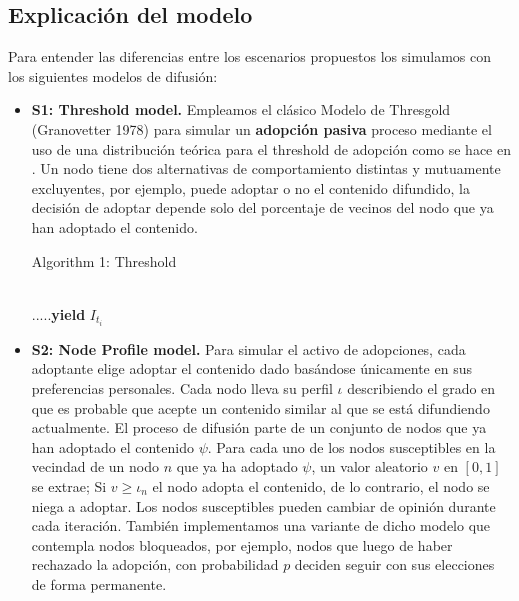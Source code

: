\documentclass{article}
\begin{document}
\subsection{Explicación del modelo}
Para entender las diferencias entre los escenarios propuestos los simulamos con los siguientes modelos de difusión:
\begin{itemize}
 \item \textbf{S1: Threshold model.} Empleamos el clásico Modelo de Thresgold (Granovetter 1978) para simular un \textbf{adopción pasiva} proceso mediante el uso de una distribución teórica para el threshold de adopción como se hace en \cite[Watts 2002]{watts:2002}. Un nodo tiene dos alternativas de comportamiento distintas y mutuamente excluyentes, por ejemplo, puede adoptar o no el contenido difundido, la decisión de adoptar depende solo del porcentaje de vecinos del nodo que ya han adoptado el contenido.
 
  
 \begin{algorithm} 
 	\caption{Algorithm 1: Threshold}
 	\begin{algorithmic}[1]	
 			\EndIf
 			\EndIf
	\\ \textbf{$.....$yield} $I_{t_i}$
	 \EndFor
	 \EndFor			
 	\end{algorithmic}
 \end{algorithm}
 
 \item \textbf{S2: Node Profile model.}
Para simular el activo de adopciones, cada adoptante elige adoptar el contenido dado basándose únicamente en sus preferencias personales. Cada nodo lleva su perfil $\iota$ describiendo el grado en que es probable que acepte un contenido similar al que se está difundiendo actualmente. El proceso de difusión parte de un conjunto de nodos que ya han adoptado el contenido $\psi$. Para cada uno de los nodos susceptibles en la vecindad de un nodo $n$ que ya ha adoptado $\psi$, un valor aleatorio $v$ en $[0,1]$ se extrae; Si $v \geq \iota_n$ el nodo adopta el contenido, de lo contrario, el nodo se niega a adoptar. Los nodos susceptibles pueden cambiar de opinión durante cada iteración. También implementamos una variante de dicho modelo que contempla nodos bloqueados, por ejemplo, nodos que luego de haber rechazado la adopción, con probabilidad $p$ deciden seguir con sus elecciones de forma permanente. 


\end{itemize}
\end{document}
